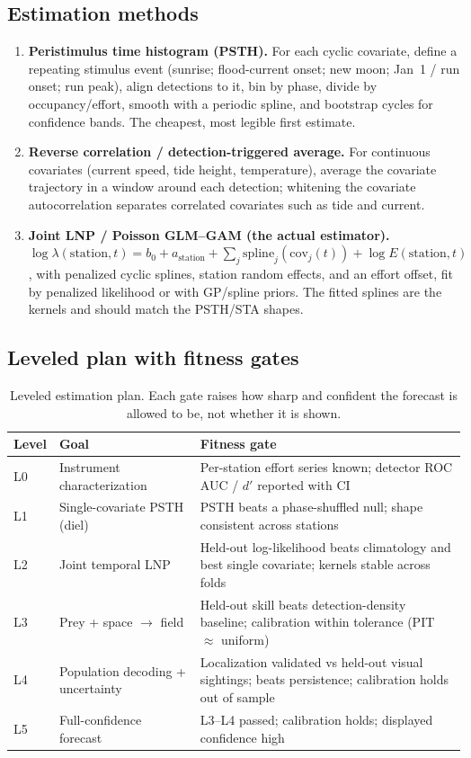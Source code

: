 \documentclass[11pt]{article}
\begin{document}
\subsection{Estimation methods}
\begin{enumerate}
  \item \textbf{Peristimulus time histogram (PSTH).} For each cyclic covariate,
  define a repeating stimulus event (sunrise; flood-current onset; new moon;
  Jan~1 / run onset; run peak), align detections to it, bin by phase, divide by
  occupancy/effort, smooth with a periodic spline, and bootstrap cycles for
  confidence bands. The cheapest, most legible first estimate.
  \item \textbf{Reverse correlation / detection-triggered average.} For
  continuous covariates (current speed, tide height, temperature), average the
  covariate trajectory in a window around each detection; whitening the covariate
  autocorrelation separates correlated covariates such as tide and current.
  \item \textbf{Joint LNP / Poisson GLM--GAM (the actual estimator).}
  $\log \lambda(\text{station}, t) = b_0 + a_{\text{station}} + \sum_j
  \text{spline}_j(\text{cov}_j(t)) + \log E(\text{station}, t)$, with penalized
  cyclic splines, station random effects, and an effort offset, fit by penalized
  likelihood or with GP/spline priors. The fitted splines are the kernels and
  should match the PSTH/STA shapes.
\end{enumerate}

\subsection{Leveled plan with fitness gates}
\begin{table}[ht]
  \centering
  \small
  \begin{tabular}{@{}llp{6.4cm}@{}}
    \toprule
    Level & Goal & Fitness gate \\
    \midrule
    L0 & Instrument characterization & Per-station effort series known; detector ROC AUC / $d'$ reported with CI \\
    L1 & Single-covariate PSTH (diel) & PSTH beats a phase-shuffled null; shape consistent across stations \\
    L2 & Joint temporal LNP & Held-out log-likelihood beats climatology and best single covariate; kernels stable across folds \\
    L3 & Prey + space $\to$ field & Held-out skill beats detection-density baseline; calibration within tolerance (PIT $\approx$ uniform) \\
    L4 & Population decoding + uncertainty & Localization validated vs held-out visual sightings; beats persistence; calibration holds out of sample \\
    L5 & Full-confidence forecast & L3--L4 passed; calibration holds; displayed confidence high \\
    \bottomrule
  \end{tabular}
  \caption{Leveled estimation plan. Each gate raises how sharp and confident the
  forecast is allowed to be, not whether it is shown.}
  \label{tab:levels}
\end{table}
\end{document}
